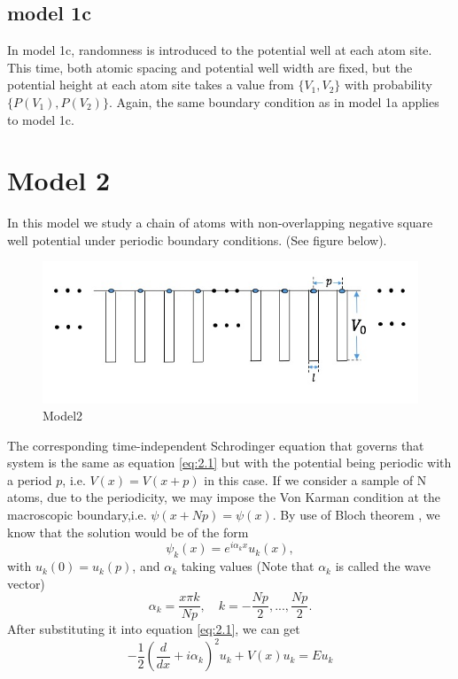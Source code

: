 \subsection{model 1c}
In model 1c, randomness is introduced to the potential well at each atom site. This time, both atomic spacing and potential well width  are  fixed, but the potential height at each atom site takes a value from $\{V_1,V_2\}$ with probability $\{P(V_1),P(V_2)\}$. Again, the same boundary condition as in model 1a applies to model 1c. 

\section{Model 2}\label{bloch theorem}
In this model we study a chain of atoms with non-overlapping negative square well potential under periodic boundary conditions. (See figure below).
\begin{figure}[h]
\centering
\includegraphics[scale=0.75]{Graphics/kp_bandgap.jpeg}
\caption{Model2}
\label{fig:net}
\end{figure}
The corresponding time-independent Schrodinger equation that governs that system is the same as equation \ref{eq:2.1} but with the potential being periodic with a period $p$, i.e. $V(x) = V(x+p)$ in this case. 
If we consider a sample of N atoms, due to the periodicity, we may impose the Von Karman condition\cite{BoundaryCondition} at the macroscopic boundary,i.e. $\psi(x+Np) = \psi(x)$. 
By use of Bloch theorem \cite{BlochTheorem}, we know that the solution would be of the form $$\psi_k(x) = e^{i{\alpha_k}x}u_k(x),$$ with $u_k(0) = u_k(p)$,
and $\alpha_k$ taking values (Note that $\alpha_k$ is called the wave vector)
$$\alpha_k = \frac{x\pi k}{Np}, \quad k = -\frac{Np}{2},...,\frac{Np}{2}. $$
After substituting it into equation \ref{eq:2.1}, we can get
\begin{equation}\label{eq:2.2bloch}
-\frac{1}{2}(\frac{d}{dx}+i\alpha_k)^2u_k+V(x)u_k = Eu_k
\end{equation}

